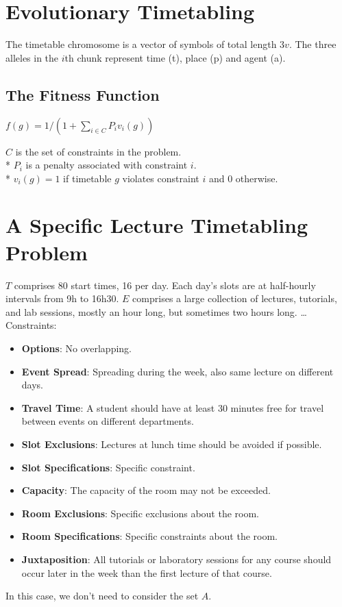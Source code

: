 \documentclass[12pt]{book}
\begin{document}
\section{Evolutionary Timetabling}
The timetable chromosome is a vector of symbols of total length $3v$. The three alleles in the $i$th chunk represent time (t), place (p) and agent (a).

\subsection{The Fitness Function}
\begin{center}
$f(g) = 1/(1 + \sum_{i \in C} P_i v_i(g))$
\end{center}
$C$ is the set of constraints in the problem.\\*
$P_i$ is a penalty associated with constraint $i$.\\*
$v_i(g) = 1$ if timetable $g$ violates constraint $i$ and 0 otherwise.

\section{A Specific Lecture Timetabling Problem}
$T$ comprises 80 start times, 16 per day. Each day's slots are at half-hourly intervals from 9h to 16h30. $E$ comprises a large collection of lectures, tutorials, and lab sessions, mostly an hour long, but sometimes two hours long. \dots\\
Constraints:
\begin{itemize}
\item \textbf{Options}: No overlapping.
\item \textbf{Event Spread}: Spreading during the week, also same lecture on different days.
\item \textbf{Travel Time}: A student should have at least 30 minutes free for travel between events on different departments.
\item \textbf{Slot Exclusions}: Lectures at lunch time should be avoided if possible.
\item \textbf{Slot Specifications}: Specific constraint.
\item \textbf{Capacity}: The capacity of the room may not be exceeded.
\item \textbf{Room Exclusions}: Specific exclusions about the room.
\item \textbf{Room Specifications}: Specific constraints about the room.
\item \textbf{Juxtaposition}: All tutorials or laboratory sessions for any course should occur later in the week than the first lecture of that course.
\end{itemize}
In this case, we don't need to consider the set $A$.
\end{document}
